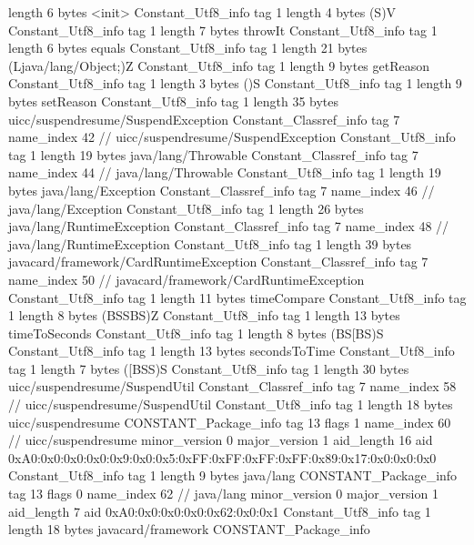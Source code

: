 {{{			length	6
			bytes	<init>
		}
		Constant_Utf8_info {
			tag	1
			length	4
			bytes	(S)V
		}
		Constant_Utf8_info {
			tag	1
			length	7
			bytes	throwIt
		}
		Constant_Utf8_info {
			tag	1
			length	6
			bytes	equals
		}
		Constant_Utf8_info {
			tag	1
			length	21
			bytes	(Ljava/lang/Object;)Z
		}
		Constant_Utf8_info {
			tag	1
			length	9
			bytes	getReason
		}
		Constant_Utf8_info {
			tag	1
			length	3
			bytes	()S
		}
		Constant_Utf8_info {
			tag	1
			length	9
			bytes	setReason
		}
		Constant_Utf8_info {
			tag	1
			length	35
			bytes	uicc/suspendresume/SuspendException
		}
		Constant_Classref_info {
			tag	7
			name_index	42		// uicc/suspendresume/SuspendException
		}
		Constant_Utf8_info {
			tag	1
			length	19
			bytes	java/lang/Throwable
		}
		Constant_Classref_info {
			tag	7
			name_index	44		// java/lang/Throwable
		}
		Constant_Utf8_info {
			tag	1
			length	19
			bytes	java/lang/Exception
		}
		Constant_Classref_info {
			tag	7
			name_index	46		// java/lang/Exception
		}
		Constant_Utf8_info {
			tag	1
			length	26
			bytes	java/lang/RuntimeException
		}
		Constant_Classref_info {
			tag	7
			name_index	48		// java/lang/RuntimeException
		}
		Constant_Utf8_info {
			tag	1
			length	39
			bytes	javacard/framework/CardRuntimeException
		}
		Constant_Classref_info {
			tag	7
			name_index	50		// javacard/framework/CardRuntimeException
		}
		Constant_Utf8_info {
			tag	1
			length	11
			bytes	timeCompare
		}
		Constant_Utf8_info {
			tag	1
			length	8
			bytes	(BSSBS)Z
		}
		Constant_Utf8_info {
			tag	1
			length	13
			bytes	timeToSeconds
		}
		Constant_Utf8_info {
			tag	1
			length	8
			bytes	(BS[BS)S
		}
		Constant_Utf8_info {
			tag	1
			length	13
			bytes	secondsToTime
		}
		Constant_Utf8_info {
			tag	1
			length	7
			bytes	([BSS)S
		}
		Constant_Utf8_info {
			tag	1
			length	30
			bytes	uicc/suspendresume/SuspendUtil
		}
		Constant_Classref_info {
			tag	7
			name_index	58		// uicc/suspendresume/SuspendUtil
		}
		Constant_Utf8_info {
			tag	1
			length	18
			bytes	uicc/suspendresume
		}
		CONSTANT_Package_info {
			tag	13
			flags	1
			name_index	60		// uicc/suspendresume
			minor_version	0
			major_version	1
			aid_length	16
			aid	0xA0:0x0:0x0:0x0:0x9:0x0:0x5:0xFF:0xFF:0xFF:0xFF:0x89:0x17:0x0:0x0:0x0
		}
		Constant_Utf8_info {
			tag	1
			length	9
			bytes	java/lang
		}
		CONSTANT_Package_info {
			tag	13
			flags	0
			name_index	62		// java/lang
			minor_version	0
			major_version	1
			aid_length	7
			aid	0xA0:0x0:0x0:0x0:0x62:0x0:0x1
		}
		Constant_Utf8_info {
			tag	1
			length	18
			bytes	javacard/framework
		}
		CONSTANT_Package_info {
}}}

